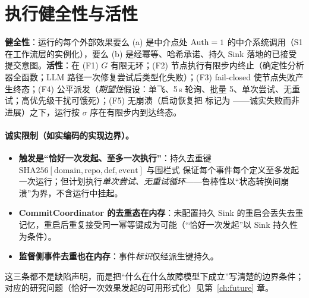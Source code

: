 \section{执行健全性与活性}

\begin{proposition}[执行健全性与活性]\label{prop:execsound}
\textbf{健全性}：运行的每个外部效果要么 (a) 是中介点处 $\operatorname{Auth}=1$ 的中介系统调用（S1 在工作流层的实例化），要么 (b) 是经幂等、哈希承诺、持久 Sink 落地的已接受提交意图。\textbf{活性}：在 (F1) $G$ 有限无环；(F2) 节点执行有限步内终止（确定性分析器全函数；LLM 路径一次修复尝试后类型化失败）；(F3) fail-closed 使节点失败产生终态；(F4) 公平派发（\emph{期望性}假设：单飞、5\,s 轮询、批量 5、单次尝试、无重试；高优先级干扰可饿死）；(F5) 无崩溃（启动恢复把  标记为 ——诚实失败而非进展）之下，运行按 $\sigma$ 序在有限步内到达终态。
\end{proposition}

\paragraph{诚实限制（如实编码的实现边界）。}
\begin{itemize}[itemsep=0.05em]
  \item \textbf{触发是“恰好一次发起、至多一次执行”}：持久去重键 $\mathrm{SHA256}[\text{domain},\text{repo},\text{def},\text{event}]$ 与围栏式  保证每个事件每个定义至多发起一次运行；但计划执行\emph{单次尝试、无重试循环}——鲁棒性以“状态转换间崩溃”为界，不含运行中挂起。
  \item \textbf{CommitCoordinator 的去重态在内存}：未配置持久 Sink 的重启会丢失去重记忆，重启后重复接受同一幂等键成为可能（“恰好一次发起”以 Sink 持久性为条件）。
  \item \textbf{监督侧事件去重也在内存}：事件\emph{标识}仅经派生键持久。
\end{itemize}
这三条都不是缺陷声明，而是把“什么在什么故障模型下成立”写清楚的边界条件；对应的研究问题（恰好一次效果发起的可用形式化）见第~\ref{ch:future} 章。
